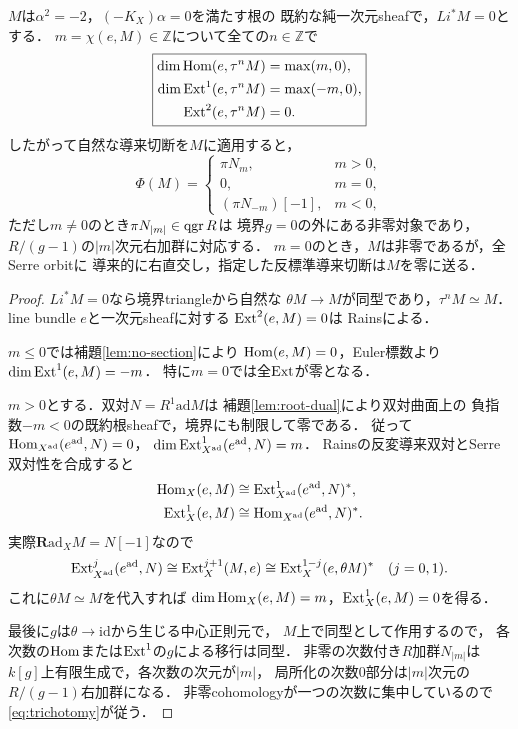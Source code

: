 \begin{theorem}
\label{thm:sign}
$M$は$\alpha^2=-2$，$(-K_X)\alpha=0$を満たす根の
既約な純一次元sheafで，$Li^*M=0$とする．
$m=\chi(e,M)\in\mathbb Z$について全ての$n\in\mathbb Z$で
\[
\boxed{
\begin{aligned}
\dim\operatorname{Hom}(e,\tau^nM)&=\max(m,0),\\
\dim\operatorname{Ext}^1(e,\tau^nM)&=\max(-m,0),\\
\operatorname{Ext}^2(e,\tau^nM)&=0.
\end{aligned}}
\]
したがって自然な導来切断を$M$に適用すると，
\begin{equation}\label{eq:trichotomy}
 \Phi(M)=
 \begin{cases}
   \pi N_m,&m>0,\\
   0,&m=0,\\
   (\pi N_{-m})[-1],&m<0,
 \end{cases}
\end{equation}
ただし$m\ne0$のとき$\pi N_{|m|}\in\operatorname{qgr} R$は
境界$g=0$の外にある非零対象であり，
$R/(g-1)$の$|m|$次元右加群に対応する．
$m=0$のとき，$M$は非零であるが，全Serre orbitに
導来的に右直交し，指定した反標準導来切断は$M$を零に送る．
\end{theorem}
\begin{proof}
$Li^*M=0$なら境界triangleから自然な
$\theta M\to M$が同型であり，$\tau^nM\simeq M$．
line bundle $e$と一次元sheafに対する
$\operatorname{Ext}^2(e,M)=0$は
Rains\cite[Corollary 7.23]{RainsBirational}による．

$m\le0$では補題\ref{lem:no-section}により
$\operatorname{Hom}(e,M)=0$，Euler標数より$\dim\operatorname{Ext}^1(e,M)=-m$．
特に$m=0$では全$\operatorname{Ext}$が零となる．

$m>0$とする．双対$N=R^1\mathrm{ad}M$は
補題\ref{lem:root-dual}により双対曲面上の
負指数$-m<0$の既約根sheafで，境界にも制限して零である．
従って$\operatorname{Hom}_{X^{\mathrm{ad}}}(e^{\mathrm{ad}},N)=0$，
$\dim\operatorname{Ext}^1_{X^{\mathrm{ad}}}(e^{\mathrm{ad}},N)=m$．
Rainsの反変導来双対とSerre双対性を合成すると
\begin{equation}\label{eq:dual-ext}
\begin{aligned}
\operatorname{Hom}_X(e,M)
 &\cong\operatorname{Ext}^1_{X^{\mathrm{ad}}}(e^{\mathrm{ad}},N)^*,\\
\operatorname{Ext}^1_X(e,M)
 &\cong\operatorname{Hom}_{X^{\mathrm{ad}}}(e^{\mathrm{ad}},N)^*.
\end{aligned}
\end{equation}
実際$\mathbf R\mathrm{ad}_XM=N[-1]$なので
\[
 \operatorname{Ext}^{j}_{X^{\mathrm{ad}}}(e^{\mathrm{ad}},N)
 \cong\operatorname{Ext}_X^{j+1}(M,e)
 \cong\operatorname{Ext}_X^{1-j}(e,\theta M)^*
\quad (j=0,1).
\]
これに$\theta M\simeq M$を代入すれば
$\dim\operatorname{Hom}_X(e,M)=m$，$\operatorname{Ext}_X^1(e,M)=0$を得る．

最後に$g$は$\theta\to\mathrm{id}$から生じる中心正則元で，
$M$上で同型として作用するので，
各次数の$\operatorname{Hom}$または$\operatorname{Ext}^1$の$g$による移行は同型．
非零の次数付き$R$加群$N_{|m|}$は
$k[g]$上有限生成で，各次数の次元が$|m|$，
局所化の次数0部分は$|m|$次元の$R/(g-1)$右加群になる．
非零cohomologyが一つの次数に集中しているので
\eqref{eq:trichotomy}が従う．
\end{proof}

